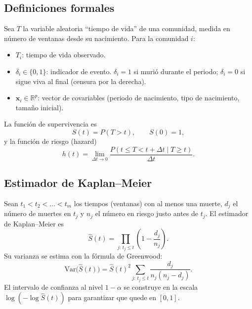 \documentclass[12pt]{article}
\begin{document}
\subsection{Definiciones formales}
Sea $T$ la variable aleatoria ``tiempo de vida'' de una comunidad, medida en número de ventanas desde su nacimiento. Para la comunidad $i$:
\begin{itemize}
\item $T_i$: tiempo de vida observado.
\item $\delta_i \in \{0,1\}$: indicador de evento. $\delta_i = 1$ si murió durante el periodo; $\delta_i = 0$ si sigue viva al final (censura por la derecha).
\item $\mathbf{x}_i \in \mathbb{R}^p$: vector de covariables (periodo de nacimiento, tipo de nacimiento, tamaño inicial).
\end{itemize}
La función de supervivencia es
\begin{equation}
S(t) = P(T > t), \qquad S(0)=1,
\end{equation}
y la función de riesgo (hazard)
\begin{equation}
h(t) = \lim_{\Delta t \to 0} \frac{P(t \le T < t + \Delta t \mid T \ge t)}{\Delta t}.
\end{equation}

\subsection{Estimador de Kaplan--Meier}
Sean $t_1 < t_2 < \dots < t_m$ los tiempos (ventanas) con al menos una muerte, $d_j$ el número de muertes en $t_j$ y $n_j$ el número en riesgo justo antes de $t_j$. El estimador de Kaplan--Meier es
\begin{equation}
\hat{S}(t) = \prod_{j:\, t_j \le t} \left(1 - \frac{d_j}{n_j}\right).
\label{eq:km}
\end{equation}
Su varianza se estima con la fórmula de Greenwood:
\begin{equation}
\widehat{\mathrm{Var}}\bigl(\hat{S}(t)\bigr) = \hat{S}(t)^2 \sum_{j:\, t_j \le t} \frac{d_j}{n_j (n_j - d_j)}.
\end{equation}
El intervalo de confianza al nivel $1-\alpha$ se construye en la escala $\log(-\log \hat{S}(t))$ para garantizar que quede en $[0,1]$.
\end{document}
